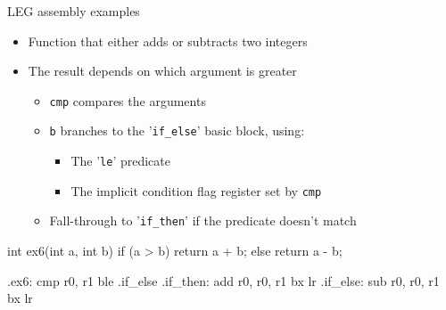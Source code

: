 
\begin{frame}[fragile]{LEG assembly examples}

\begin{itemize}
    \item Function that either adds or subtracts two integers
    \item The result depends on which argument is greater
    \begin{itemize}
        \item \texttt{cmp} compares the arguments
        \item \texttt{b} branches to the '\texttt{if\_else}' basic block, using:
        \begin{itemize}
            \item The '\texttt{le}' predicate
            \item The implicit condition flag register set by \texttt{cmp}
        \end{itemize}
        \item Fall-through to '\texttt{if\_then}' if the predicate doesn't match
    \end{itemize}
\end{itemize}

\begin{minipage}[t]{0.50\linewidth}
\begin{codebox}
int ex6(int a, int b) {
    if (a > b) {
        return a + b;
    } else {
        return a - b;
    }
}


\end{codebox}
\end{minipage}
\begin{minipage}[t]{0.49\linewidth}
\begin{codebox}
.ex6:
    cmp r0, r1
    ble .if_else
.if_then:
    add r0, r0, r1
    bx lr
.if_else:
    sub r0, r0, r1
    bx lr
\end{codebox}
\end{minipage}

\end{frame}



